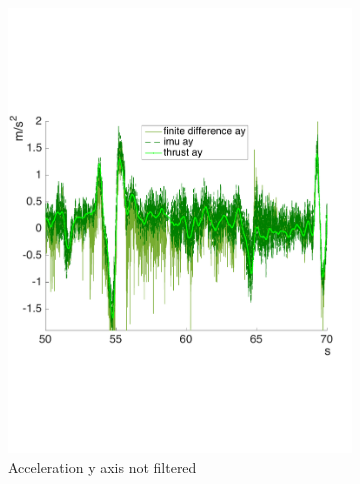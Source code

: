 \begin{figure}[!htbp]
   \begin{subfigure}[b]{0.45\textwidth}
     \includegraphics[width=\textwidth]{img/acc_y_raw.pdf}
        \caption{Acceleration y axis  not filtered}
        \label{fig:comparison_accy}
   \end{subfigure}
    \begin{subfigure}[b]{0.45\textwidth}

\end{subfigure}
\end{figure}
